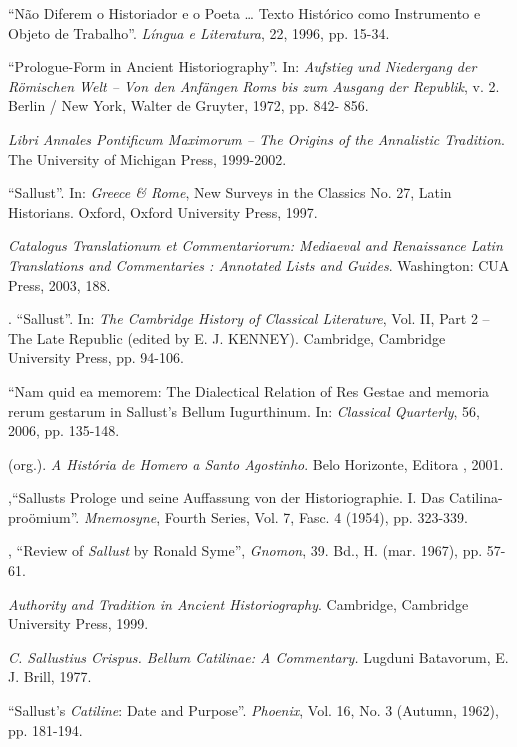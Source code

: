 \begin{bibliohedra}
 
 ``Não Diferem o Historiador e o Poeta … Texto Histórico como Instrumento e Objeto de Trabalho”. \emph{Língua e Literatura}, 22, 1996, pp. 15-34.

  “Prologue-Form in Ancient Historiography”. In: \emph{Aufstieg und Niedergang der Römischen Welt – Von den Anfängen Roms bis zum Ausgang der Republik}, v. 2. Berlin / New York, Walter de Gruyter, 1972, pp. 842- 856.

 

 \emph{Libri Annales Pontificum Maximorum – The Origins of the Annalistic Tradition}. The University of Michigan Press, 1999-2002. 

 “Sallust”. In: \emph{Greece \& Rome}, New Surveys in the Classics No. 27, Latin Historians. Oxford, Oxford University Press, 1997.

 \emph{Catalogus Translationum et Commentariorum: Mediaeval and Renaissance Latin Translations and Commentaries : Annotated Lists and Guides}. Washington: CUA Press, 2003, 188.

. “Sallust”. In: \emph{The Cambridge History of Classical Literature}, Vol. II, Part 2 – The Late Republic (edited by E. J. KENNEY). Cambridge, Cambridge University Press, pp. 94-106.

 “Nam quid ea memorem: The Dialectical Relation of Res Gestae and memoria rerum gestarum in Sallust’s Bellum Iugurthinum. In: \emph{Classical Quarterly}, 56, 2006, pp. 135-148.

 (org.). \emph{A História de Homero a Santo Agostinho}. Belo Horizonte, Editora , 2001. 

,``Sallusts Prologe und seine Auffassung von der Historiographie. I. Das Catilina-proömium''. \emph{Mnemosyne}, Fourth Series, Vol. 7, Fasc. 4 (1954), pp. 323-339.


, “Review of \emph{Sallust} by Ronald Syme”, \emph{Gnomon}, 39. Bd., H. (mar. 1967), pp. 57-61.

 
 

 \emph{Authority and Tradition in Ancient Historiography}. Cambridge, Cambridge University Press, 1999.

 
  \emph{C. Sallustius Crispus. Bellum Catilinae: A Commentary.} Lugduni Batavorum, E. J. Brill, 1977.
 
  ``Sallust's \emph{Catiline}: Date and Purpose''. \emph{Phoenix}, Vol. 16, No. 3 (Autumn, 1962), pp. 181-194.
 


\end{bibliohedra}

